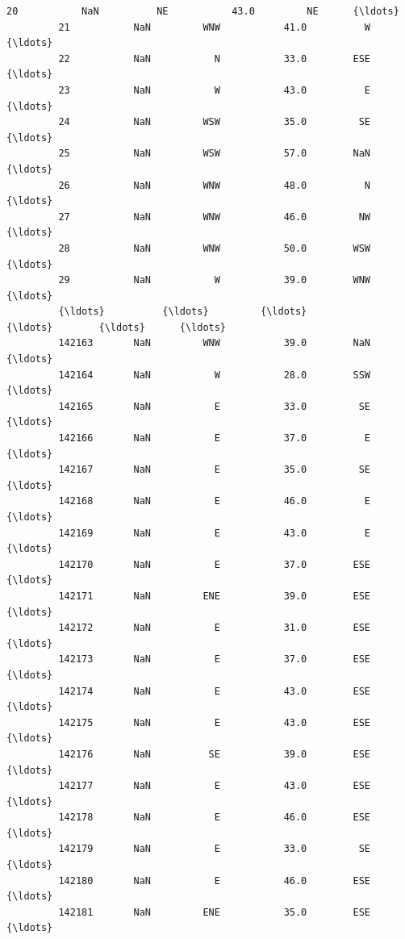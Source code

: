 \documentclass[11pt]{article}
\begin{document}
\begin{Verbatim}[commandchars=\\\{\}]
         20           NaN          NE           43.0         NE      {\ldots}        
         21           NaN         WNW           41.0          W      {\ldots}        
         22           NaN           N           33.0        ESE      {\ldots}        
         23           NaN           W           43.0          E      {\ldots}        
         24           NaN         WSW           35.0         SE      {\ldots}        
         25           NaN         WSW           57.0        NaN      {\ldots}        
         26           NaN         WNW           48.0          N      {\ldots}        
         27           NaN         WNW           46.0         NW      {\ldots}        
         28           NaN         WNW           50.0        WSW      {\ldots}        
         29           NaN           W           39.0        WNW      {\ldots}        
         {\ldots}          {\ldots}         {\ldots}            {\ldots}        {\ldots}      {\ldots}        
         142163       NaN         WNW           39.0        NaN      {\ldots}        
         142164       NaN           W           28.0        SSW      {\ldots}        
         142165       NaN           E           33.0         SE      {\ldots}        
         142166       NaN           E           37.0          E      {\ldots}        
         142167       NaN           E           35.0         SE      {\ldots}        
         142168       NaN           E           46.0          E      {\ldots}        
         142169       NaN           E           43.0          E      {\ldots}        
         142170       NaN           E           37.0        ESE      {\ldots}        
         142171       NaN         ENE           39.0        ESE      {\ldots}        
         142172       NaN           E           31.0        ESE      {\ldots}        
         142173       NaN           E           37.0        ESE      {\ldots}        
         142174       NaN           E           43.0        ESE      {\ldots}        
         142175       NaN           E           43.0        ESE      {\ldots}        
         142176       NaN          SE           39.0        ESE      {\ldots}        
         142177       NaN           E           43.0        ESE      {\ldots}        
         142178       NaN           E           46.0        ESE      {\ldots}        
         142179       NaN           E           33.0         SE      {\ldots}        
         142180       NaN           E           46.0        ESE      {\ldots}        
         142181       NaN         ENE           35.0        ESE      {\ldots}        

\end{Verbatim}
\end{document}
